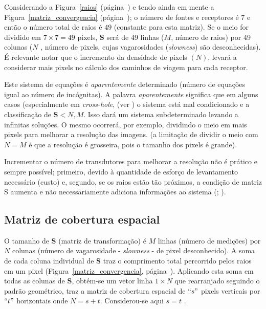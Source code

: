 \documentclass[a4paper, 12 pt]{article} %
\begin{document}
Considerando a Figura~\ref{raios} (página~\pageref{raios}) e tendo ainda em mente a Figura~\ref{matriz_convergencia} (página~\pageref{matriz_convergencia}); o número de fontes e receptores é $7$ e então o número total de raios é $49$ (constante para esta matriz). Se o meio for dividido em $7 \times 7 = 49$ pixels, $\textbf{S}$ será de 49 linhas ($M$, número de raios) por 49 colunas ($N$ , número de pixels, cujas vagarosidades (\textit{slowness}) são desconhecidas). É relevante notar que o incremento da densidade de pixels $(N)$, levará a considerar mais pixels no cálculo dos caminhos de viagem para cada receptor.

Este sistema de equações é \textit{aparentemente} determinado (número de equações igual ao número de incógnitas). A palavra \textit{aparentemente} significa que em alguns casos (especialmente em \textit{cross-hole}, (ver \citealp{imhof2007caracterizacion}) o sistema está mal condicionado e a classificação de $\textbf{S} < N , M$. Isso dará um sistema subdeterminado levando a infinitas soluções. O mesmo ocorrerá, por exemplo, dividindo o meio em mais pixels para melhorar a resolução das imagens. (a limitação de dividir o meio com $N = M$ é que a resolução é grosseira, pois o tamanho dos pixels é grande).

Incrementar o número de transdutores para melhorar a resolução não é prático e sempre possível; primeiro, devido à quantidade de esforço de levantamento necessário (custo) e, segundo, se os raios estão tão próximos, a condição de matriz S aumenta e não necessariamente adiciona informações ao sistema (\citealp{santamarina1998introduction}; \citealp{fernandez2000tomographic}).


\subsection{Matriz de cobertura espacial}

O tamanho de $\textbf{S}$ (matriz de transformação) é $M$ linhas (número de medições) por $N$ colunas (número de vagarosidade - \textit{slowness} - de pixel desconhecido). A soma de cada coluna individual de $\textbf{S}$ traz o comprimento total percorrido pelos raios em um pixel (Figura~\ref{matriz_convergencia}, página~\pageref{matriz_convergencia}). Aplicando esta soma em todas as colunas de $\textbf{S}$, obtém-se um vetor linha $1 \times N$ que rearranjado seguindo o padrão geométrico, traz a matriz de cobertura espacial de $``s"$ pixels verticais por $``t"$ horizontais onde $N = s + t$. Considerou-se aqui $s = t$ \citep{RBGf1495}.
\end{document}

